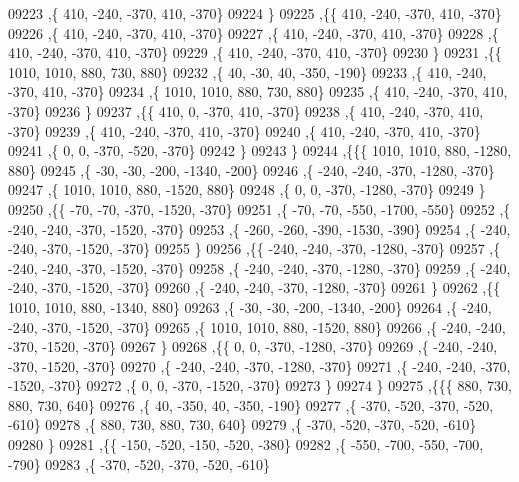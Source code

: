 \begin{DoxyCode}
09223     ,\{   410,  -240,  -370,   410,  -370\}
09224     \}
09225    ,\{\{   410,  -240,  -370,   410,  -370\}
09226     ,\{   410,  -240,  -370,   410,  -370\}
09227     ,\{   410,  -240,  -370,   410,  -370\}
09228     ,\{   410,  -240,  -370,   410,  -370\}
09229     ,\{   410,  -240,  -370,   410,  -370\}
09230     \}
09231    ,\{\{  1010,  1010,   880,   730,   880\}
09232     ,\{    40,   -30,    40,  -350,  -190\}
09233     ,\{   410,  -240,  -370,   410,  -370\}
09234     ,\{  1010,  1010,   880,   730,   880\}
09235     ,\{   410,  -240,  -370,   410,  -370\}
09236     \}
09237    ,\{\{   410,     0,  -370,   410,  -370\}
09238     ,\{   410,  -240,  -370,   410,  -370\}
09239     ,\{   410,  -240,  -370,   410,  -370\}
09240     ,\{   410,  -240,  -370,   410,  -370\}
09241     ,\{     0,     0,  -370,  -520,  -370\}
09242     \}
09243    \}
09244   ,\{\{\{  1010,  1010,   880, -1280,   880\}
09245     ,\{   -30,   -30,  -200, -1340,  -200\}
09246     ,\{  -240,  -240,  -370, -1280,  -370\}
09247     ,\{  1010,  1010,   880, -1520,   880\}
09248     ,\{     0,     0,  -370, -1280,  -370\}
09249     \}
09250    ,\{\{   -70,   -70,  -370, -1520,  -370\}
09251     ,\{   -70,   -70,  -550, -1700,  -550\}
09252     ,\{  -240,  -240,  -370, -1520,  -370\}
09253     ,\{  -260,  -260,  -390, -1530,  -390\}
09254     ,\{  -240,  -240,  -370, -1520,  -370\}
09255     \}
09256    ,\{\{  -240,  -240,  -370, -1280,  -370\}
09257     ,\{  -240,  -240,  -370, -1520,  -370\}
09258     ,\{  -240,  -240,  -370, -1280,  -370\}
09259     ,\{  -240,  -240,  -370, -1520,  -370\}
09260     ,\{  -240,  -240,  -370, -1280,  -370\}
09261     \}
09262    ,\{\{  1010,  1010,   880, -1340,   880\}
09263     ,\{   -30,   -30,  -200, -1340,  -200\}
09264     ,\{  -240,  -240,  -370, -1520,  -370\}
09265     ,\{  1010,  1010,   880, -1520,   880\}
09266     ,\{  -240,  -240,  -370, -1520,  -370\}
09267     \}
09268    ,\{\{     0,     0,  -370, -1280,  -370\}
09269     ,\{  -240,  -240,  -370, -1520,  -370\}
09270     ,\{  -240,  -240,  -370, -1280,  -370\}
09271     ,\{  -240,  -240,  -370, -1520,  -370\}
09272     ,\{     0,     0,  -370, -1520,  -370\}
09273     \}
09274    \}
09275   ,\{\{\{   880,   730,   880,   730,   640\}
09276     ,\{    40,  -350,    40,  -350,  -190\}
09277     ,\{  -370,  -520,  -370,  -520,  -610\}
09278     ,\{   880,   730,   880,   730,   640\}
09279     ,\{  -370,  -520,  -370,  -520,  -610\}
09280     \}
09281    ,\{\{  -150,  -520,  -150,  -520,  -380\}
09282     ,\{  -550,  -700,  -550,  -700,  -790\}
09283     ,\{  -370,  -520,  -370,  -520,  -610\}

\end{DoxyCode}
